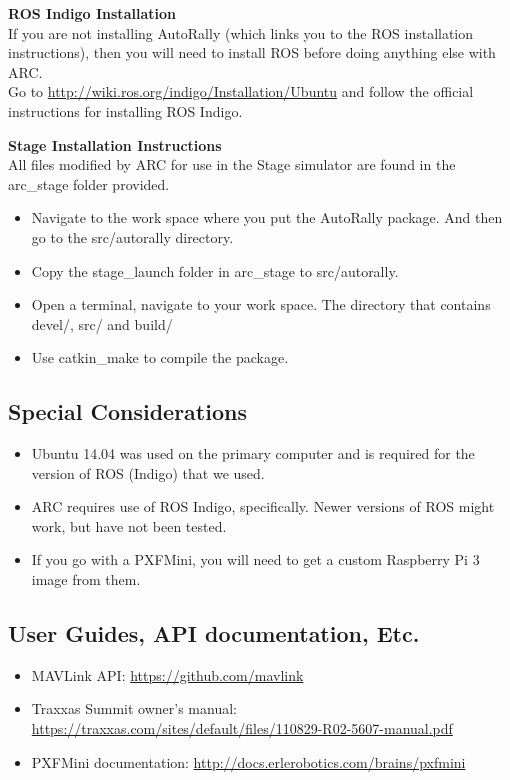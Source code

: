 \documentclass[compsoc,draftclsnofoot,onecolumn,10pt]{IEEEtran}
\begin{document}
    \textbf{ROS Indigo Installation}\\
    If you are not installing AutoRally (which links you to the ROS installation instructions), then you will need to install ROS before doing anything else with ARC.\\
    Go to \href{http://wiki.ros.org/indigo/Installation/Ubuntu}{http://wiki.ros.org/indigo/Installation/Ubuntu} and follow the official instructions for installing ROS Indigo.

    \textbf{Stage Installation Instructions}\\
    All files modified by ARC for use in the Stage simulator are found in the arc\_stage folder provided.

    \begin{itemize}
    	\item Navigate to the work space where you put the AutoRally package. And then go to the src/autorally directory.
    	\item Copy the stage\_launch folder in arc\_stage to src/autorally.
    	\item Open a terminal, navigate to your work space. The directory that contains devel/, src/ and build/
    	\item Use catkin\_make to compile the package.
    \end{itemize}

    \subsection{Special Considerations}
    \begin{itemize}
        \item Ubuntu 14.04 was used on the primary computer and is required for the version of ROS (Indigo) that we used.
        \item ARC requires use of ROS Indigo, specifically. Newer versions of ROS might work, but have not been tested.
        \item If you go with a PXFMini, you will need to get a custom Raspberry Pi 3 image from them.
    \end{itemize}
    
    \subsection{User Guides, API documentation, Etc.} 
    \begin{itemize}
        \item MAVLink API: \href{https://github.com/mavlink}{https://github.com/mavlink}
        \item Traxxas Summit owner's manual: \href{https://traxxas.com/sites/default/files/110829-R02-5607-manual.pdf}{https://traxxas.com/sites/default/files/110829-R02-5607-manual.pdf}
        \item PXFMini documentation: \href{http://docs.erlerobotics.com/brains/pxfmini}{http://docs.erlerobotics.com/brains/pxfmini}
    \end{itemize}
    
\end{document}
